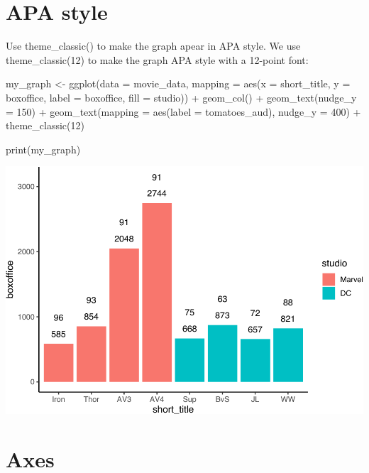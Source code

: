 \documentclass[
]{krantz}
\makeatletter
\newenvironment{Shaded}{\begin{snugshade}}{\end{snugshade}}
\newcommand{\AttributeTok}[1]{\textcolor[rgb]{0.61,0.61,0.61}{#1}}
\newcommand{\DecValTok}[1]{\textcolor[rgb]{0.06,0.06,0.06}{#1}}
\newcommand{\FunctionTok}[1]{\textcolor[rgb]{0,0,0}{#1}}
\newcommand{\NormalTok}[1]{#1}
\newcommand{\OtherTok}[1]{\textcolor[rgb]{0.37,0.37,0.37}{#1}}
\newcommand{\SpecialCharTok}[1]{\textcolor[rgb]{0,0,0}{#1}}
\newenvironment{kframe}{%
\medskip{}
\setlength{\fboxsep}{.8em}
 \def\at@end@of@kframe{}%
 \ifinner\ifhmode%
  \def\at@end@of@kframe{\end{minipage}}%
  \begin{minipage}{\columnwidth}%
 \fi\fi%
 \def\FrameCommand##1{\hskip\@totalleftmargin \hskip-\fboxsep
 \colorbox{shadecolor}{##1}\hskip-\fboxsep
     \hskip-\linewidth \hskip-\@totalleftmargin \hskip\columnwidth}%
 \MakeFramed {\advance\hsize-\width
   \@totalleftmargin\z@ \linewidth\hsize
   \@setminipage}}%
 {\par\unskip\endMakeFramed%
 \at@end@of@kframe}
\renewenvironment{Shaded}{\begin{kframe}}{\end{kframe}}
\makeatother
\begin{document}
\newpage

\hypertarget{apa-style}{%
\section{APA style}\label{apa-style}}

Use theme\_classic() to make the graph apear in APA style. We use theme\_classic(12) to make the graph APA style with a 12-point font:

\begin{Shaded}
\begin{Highlighting}[]
\NormalTok{my\_graph }\OtherTok{\textless{}{-}} \FunctionTok{ggplot}\NormalTok{(}\AttributeTok{data =}\NormalTok{ movie\_data,}
           \AttributeTok{mapping =} \FunctionTok{aes}\NormalTok{(}\AttributeTok{x =}\NormalTok{ short\_title,}
                         \AttributeTok{y =}\NormalTok{ boxoffice,}
                         \AttributeTok{label =}\NormalTok{ boxoffice, }
                         \AttributeTok{fill =}\NormalTok{ studio)) }\SpecialCharTok{+}
  \FunctionTok{geom\_col}\NormalTok{() }\SpecialCharTok{+}
  \FunctionTok{geom\_text}\NormalTok{(}\AttributeTok{nudge\_y =} \DecValTok{150}\NormalTok{)  }\SpecialCharTok{+}
  \FunctionTok{geom\_text}\NormalTok{(}\AttributeTok{mapping =} \FunctionTok{aes}\NormalTok{(}\AttributeTok{label =}\NormalTok{ tomatoes\_aud), }
            \AttributeTok{nudge\_y =} \DecValTok{400}\NormalTok{) }\SpecialCharTok{+}
  \FunctionTok{theme\_classic}\NormalTok{(}\DecValTok{12}\NormalTok{)}

\FunctionTok{print}\NormalTok{(my\_graph)}
\end{Highlighting}
\end{Shaded}

\includegraphics[width=0.65\linewidth]{bookdown_files/figure-latex/unnamed-chunk-205-1}

\hypertarget{axes}{%
\section{Axes}\label{axes}}
\end{document}
